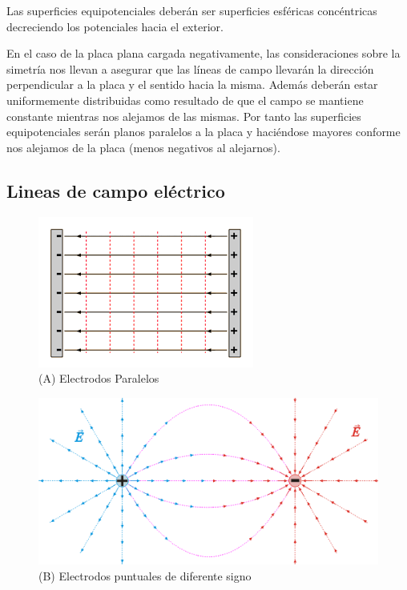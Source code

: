 \documentclass[letterpaper, 12pt]{report}
\begin{document}
Las superficies equipotenciales deberán ser superficies esféricas concéntricas
decreciendo los potenciales hacia el exterior.

\vspace{.5cm}

En el caso de la placa plana cargada negativamente, las consideraciones sobre
la simetría nos llevan a asegurar que las líneas de campo llevarán la
dirección perpendicular a la placa y el sentido hacia la misma. Además
deberán estar uniformemente distribuidas como resultado de que el campo se
mantiene constante mientras nos alejamos de las mismas. Por tanto las
superficies equipotenciales serán planos paralelos a la placa y haciéndose
mayores conforme nos alejamos de la placa (menos negativos al alejarnos).
~\cite{LineasCampoElectrico}

\subsection{Lineas de campo eléctrico}

\begin{figure}[H]
	\begin{center}
		\includegraphics[scale = 1]{./Images/A.png}
		\caption{(A) Electrodos Paralelos}
	\end{center}
\end{figure}

\begin{figure}[H]
	\begin{center}
		\includegraphics[scale = .8]{./Images/B.png}
		\caption{(B) Electrodos puntuales de diferente signo}
	\end{center}
\end{figure}
\end{document}
